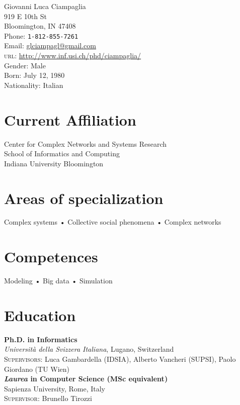 \documentclass[10pt, letterpaper]{article}
\newcommand{\years}[1]{\marginnote{\small #1}}
\begin{document}
{\LARGE Giovanni Luca Ciampaglia}\\[1cm]
919 E 10th St \\
Bloomington, IN 47408\\[.2cm]
Phone: \texttt{1-812-855-7261}\\
Email: \href{mailto:gciampag@indiana.edu}{glciampagl@gmail.com}\\
\textsc{url}: \href{http://www.inf.usi.ch/phd/ciampaglia/}{http://www.inf.usi.ch/phd/ciampaglia/}\\[.2cm]
Gender: Male\\
Born:  July 12, 1980\\
Nationality: Italian

\section*{Current Affiliation}

Center for Complex Networks and Systems Research\\
School of Informatics and Computing\\
Indiana University Bloomington

\section*{Areas of specialization}
Complex systems • Collective social phenomena • Complex networks

\section*{Competences}
Modeling • Big data • Simulation

\section*{Education}
\noindent

\years{2012}\textbf{Ph.D. in Informatics}\\
%
\textsl{Università della Svizzera Italiana}, Lugano, Switzerland\\
%
\textsc{Supervisors}: Luca Gambardella (IDSIA), Alberto Vancheri (SUPSI), Paolo
Giordano (TU Wien)\\[1em]

\years{2006}\textbf{\textsl{Laurea} in Computer Science (MSc equivalent)}\\ 
%
Sapienza University, Rome, Italy\\
%
\textsc{Supervisor}: Brunello Tirozzi \\[1em]
\end{document}
